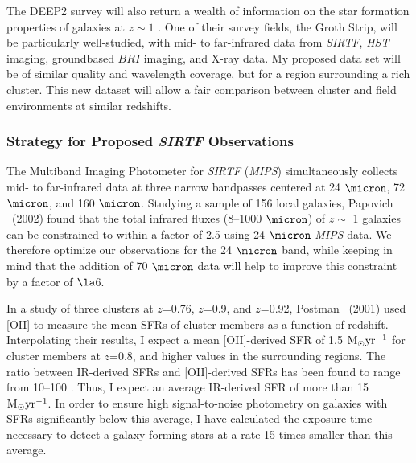 \documentclass[12pt]{plan}
\begin{document}
The DEEP2 survey will also return a wealth of information on the star
formation properties of galaxies at $z \sim 1$ \cite{Davis03}.  One
of their survey fields, the Groth Strip, will be particularly
well-studied, with mid- to far-infrared data from {\em SIRTF}, {\em
HST} imaging, groundbased $BRI$ imaging, and X-ray data.  My proposed
data set will be of similar quality and wavelength coverage, but for a
region surrounding a rich cluster.  This new dataset will allow a fair
comparison between cluster and field environments at similar
redshifts.

\vspace*{-3mm}
\subsubsection*{Strategy for Proposed \emph{SIRTF} Observations}
\vspace{-2mm}

The Multiband Imaging Photometer for \emph{SIRTF} (\emph{MIPS})
simultaneously collects mid- to far-infrared data at three narrow
bandpasses centered at 24 $\micron$, 72 $\micron$, and 160 $\micron$.
Studying a sample of 156 local galaxies, Papovich \etal\
(2002)\cite{Papovich02} found that the total infrared fluxes (8--1000
$\micron$) of $z\sim$ 1 galaxies can be constrained to within a factor
of 2.5 using 24 $\micron$ \emph{MIPS} data.  We therefore optimize our
observations for the 24 $\micron$ band, while keeping in mind that the
addition of 70 $\micron$ data will help to improve this constraint
by a factor of $\la$6.

In a study of three clusters at $z$=0.76, $z$=0.9, and $z$=0.92,
Postman \etal\ (2001)\cite{Postman01} used [OII] to measure the mean
SFRs of cluster members as a function of redshift.  Interpolating
their results, I expect a mean [OII]-derived SFR of 1.5 ${\rm
M}_{\odot} {\rm yr}^{-1}$ for cluster members at $z$=0.8, and higher
values in the surrounding regions.  The ratio between IR-derived SFRs
and [OII]-derived SFRs has been found to range from 10--100
\cite{Duc02}.  Thus, I expect an average IR-derived SFR of more than
15 ${\rm M}_{\odot} {\rm yr}^{-1}$.  In order to ensure high
signal-to-noise photometry on galaxies with SFRs significantly below
this average, I have calculated the exposure time necessary to detect
a galaxy forming stars at a rate 15 times smaller than this average.
\end{document}
